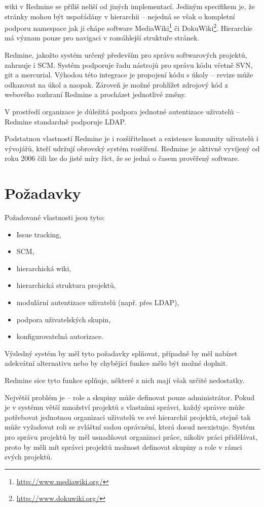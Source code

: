 \documentclass[thesis=B,czech]{FITthesis}[2012/05/02]
\begin{document}
\Gls{wiki} v Redmine se příliš neliší od jiných implementací. Jediným
specifikem je, že stránky mohou být uspořádány v hierarchii -- nejedná
se však o kompletní podporu \gls{namespace} jak ji chápe software
MediaWiki\footnote{\url{http://www.mediawiki.org/}} či
DokuWiki\footnote{\url{http://www.dokuwiki.org/}}. Hierarchie má význam
pouze pro navigaci v rozsáhlejší struktuře stránek.

Redmine, jakožto systém určený především pro správu softwarových
projektů, zahrnuje i \gls{SCM}. Systém podporuje řadu nástrojů pro
správu kódu včetně \gls{SVN}, \gls{git} a \gls{mercurial}. Výhodou této
integrace je propojení kódu s úkoly -- revize může odkazovat na úkol a
naopak. Zároveň je možné prohlížet zdrojový kód z webového rozhraní
Redmine a procházet jednotlivé změny.

V prostředí organizace je důležitá podpora jednotné autentizace
uživatelů -- Redmine standardně podporuje \gls{LDAP}.

Podstatnou vlastností Redmine je i rozšiřitelnost a existence komunity
uživatelů i vývojářů, kteří udržují obrovský systém rozšíření. Redmine
je aktivně vyvíjený od roku 2006 čili lze do jisté míry říct, že se
jedná o časem prověřený software.

\section{Požadavky}

Požadované vlastnosti jsou tyto:

\begin{itemize}
\item
  Issue tracking,
\item
  \gls{SCM},
\item
  hierarchická wiki,
\item
  hierarchická struktura projektů,
\item
  modulární autentizace uživatelů (např. přes \gls{LDAP}),
\item
  podpora uživatelských skupin,
\item
  konfigurovatelná autorizace.
\end{itemize}
Výsledný systém by měl tyto požadavky splňovat, případně by měl nabízet
adekvátní alternativu nebo by chybějící funkce mělo být možné doplnit.

Redmine sice tyto funkce splňuje, některé z nich mají však určité
nedostatky.

Největší problém je  -- role a skupiny může definovat
pouze administrátor. Pokud je v systému větší množství projektů s
vlastními správci, každý správce může potřebovat jednotnou organizaci
uživatelů ve své hierarchii projektů, stejně tak může vyžadovat roli se
zvláštní sadou oprávnění, která dosud neexistuje. Systém pro správu
projektů by měl usnadňovat organizaci práce, nikoliv práci přidělávat,
proto by měli mít správci projektů možnost definovat skupiny a role v
rámci svých projektů.
\end{document}
